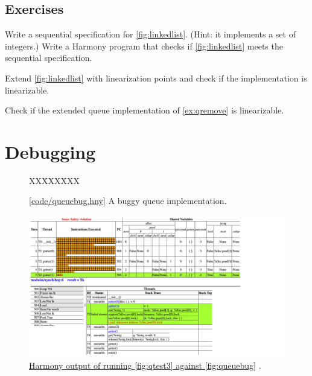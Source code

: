 \documentclass{report}
\newcommand{\harmonysource}[1]{
\begin{tabbing}
XX\=XXX\=XXX\kill
    
\end{tabbing}
}
\newcommand{\harmonylink}[1]{%
[\href{https://harmony.cs.cornell.edu/#1}{\underline{#1}}]%
}
\newcommand{\harmonyref}[2]{%
\href{https://harmony.cs.cornell.edu/output/#1}{\underline{#2}}%
}
\newenvironment{code}{
\tcolorbox
}{
\endtcolorbox
}
\begin{document}
\section*{Exercises}
\begin{problems}
\item Write a sequential specification for \autoref{fig:linkedlist}.
(Hint: it implements a set of integers.)
Write a Harmony program that checks if \autoref{fig:linkedlist} meets
the sequential specification.
\item Extend \autoref{fig:linkedlist} with linearization points and
check if the implementation is linearizable.
\item Check if the extended queue implementation of \autoref{ex:qremove}
is linearizable.
\end{problems}

\chapter{Debugging}
\label{ch:debugging}

\begin{figure}
\begin{code}
\harmonysource{queuebug}
\end{code}
\caption{\harmonylink{code/queuebug.hny} A buggy queue implementation.}
\label{fig:queuebug}
\end{figure}

\begin{figure}
\begin{center}
\includegraphics[width=\textwidth]{figures/queuebug1.pdf}
\end{center}
\caption{\harmonyref{queuebug.html}{Harmony output of running \autoref{fig:qtest3} against
\autoref{fig:queuebug}}.}
\label{fig:queuebug1}
\end{figure}
\end{document}
